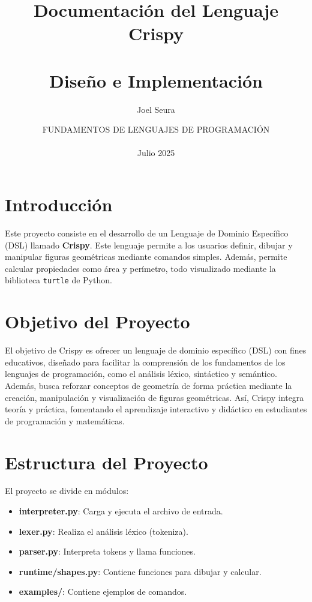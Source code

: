 \documentclass[12pt]{article}
\title{\textbf{Documentación del Lenguaje Crispy}\\[4cm] \\ Diseño e Implementación\\[4cm]}
\author{Joel Seura\\[4cm]}
\date{FUNDAMENTOS DE LENGUAJES DE PROGRAMACIÓN\\\\Julio 2025}
\begin{document}
\maketitle
\tableofcontents
\newpage

\section{Introducción}

Este proyecto consiste en el desarrollo de un Lenguaje de Dominio Específico (DSL) llamado \textbf{Crispy}. Este lenguaje permite a los usuarios definir, dibujar y manipular figuras geométricas mediante comandos simples. Además, permite calcular propiedades como área y perímetro, todo visualizado mediante la biblioteca \texttt{turtle} de Python.

\section{Objetivo del Proyecto}

El objetivo de Crispy es ofrecer un lenguaje de dominio específico (DSL) con fines educativos, diseñado para facilitar la comprensión de los fundamentos de los lenguajes de programación, como el análisis léxico, sintáctico y semántico. Además, busca reforzar conceptos de geometría de forma práctica mediante la creación, manipulación y visualización de figuras geométricas. Así, Crispy integra teoría y práctica, fomentando el aprendizaje interactivo y didáctico en estudiantes de programación y matemáticas.

\section{Estructura del Proyecto}

El proyecto se divide en módulos:
\begin{itemize}
    \item \textbf{interpreter.py}: Carga y ejecuta el archivo de entrada.
    \item \textbf{lexer.py}: Realiza el análisis léxico (tokeniza).
    \item \textbf{parser.py}: Interpreta tokens y llama funciones.
    \item \textbf{runtime/shapes.py}: Contiene funciones para dibujar y calcular.
    \item \textbf{examples/}: Contiene ejemplos de comandos.
\end{itemize}
\end{document}
